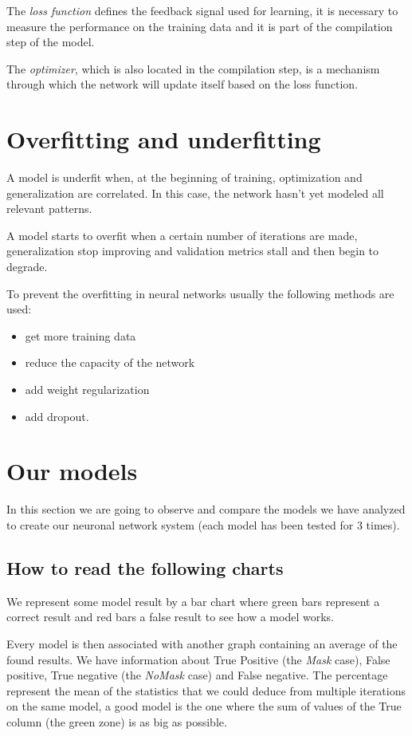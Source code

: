 \documentclass[a4paper,12pt]{article}
\begin{document}
The \textit{loss function} defines the feedback signal used for learning, it is necessary to measure the performance on the training data and it is part of the compilation step of the model.

The \textit{optimizer}, which is also located in the compilation step, is a mechanism through which the network will update itself based on the loss function.

\section{Overfitting and underfitting}
A model is underfit when, at the beginning of training, optimization and generalization are correlated. In this case, the network hasn't yet modeled all relevant patterns. 

A model starts to overfit when a certain number of iterations are made, generalization stop improving and validation metrics stall and then begin to degrade. 

To prevent the overfitting in neural networks usually the following methods are used: 

\begin{itemize}
    \item get more training data
    \item reduce the capacity of the network
    \item add weight regularization
    \item add dropout.
\end{itemize}

\section{Our models}
In this section we are going to observe and compare the models we have analyzed to create our neuronal network system (each model has been tested for 3 times). 

\subsection{How to read the following charts}
We represent some model result by a bar chart where green bars represent a correct result and red bars a false result to see how a model works.

Every model is then associated with another graph containing an average of the found results. We have information about True Positive (the \textit{Mask} case), False positive, True negative (the \textit{NoMask} case) and False negative. The percentage represent the mean of the statistics that we could deduce from multiple iterations on the same model, a good model is the one where the sum of values of the True column (the green zone) is as big as possible.
\end{document}
